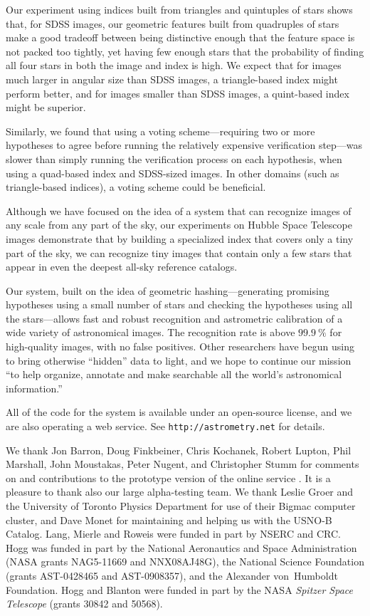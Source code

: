 Our experiment using indices built from triangles and quintuples of
stars shows that, for SDSS images, our geometric features built from
quadruples of stars make a good tradeoff between being distinctive
enough that the feature space is not packed too tightly, yet having
few enough stars that the probability of finding all four stars in
both the image and index is high.  We expect that for images much
larger in angular size than SDSS images, a triangle-based index might
perform better, and for images smaller than SDSS images, a quint-based
index might be superior.


Similarly, we found that using a voting scheme---requiring two or more
hypotheses to agree before running the relatively expensive
verification step---was slower than simply running the verification
process on each hypothesis, when using a quad-based index and
SDSS-sized images.  In other domains (such as triangle-based indices),
a voting scheme could be beneficial.


Although we have focused on the idea of a system that can recognize
images of any scale from any part of the sky, our experiments on
Hubble Space Telescope images demonstrate that by building a
specialized index that covers only a tiny part of the sky, we can
recognize tiny images that contain only a few stars that appear in
even the deepest all-sky reference catalogs.


Our system, built on the idea of geometric hashing---generating
promising hypotheses using a small number of stars and checking the
hypotheses using all the stars---allows fast and robust recognition
and astrometric calibration of a wide variety of astronomical images.
The recognition rate is above $99.9~\percent$ for high-quality images,
with no false positives.  Other researchers have begun using \an to
bring otherwise ``hidden'' data to light, and we hope to continue our
mission ``to help organize, annotate and make searchable all the
world's astronomical information.''


All of the code for the \an system is available under an open-source
license, and we are also operating a web service.  See
\mbox{\texttt{http://astrometry.net}} for details.


\acknowledgments We thank Jon Barron, Doug Finkbeiner, Chris Kochanek,
Robert Lupton, Phil Marshall, John Moustakas, Peter
Nugent, and Christopher Stumm for comments on and contributions to the
prototype version of the online service \an.  It is a pleasure to
thank also our large alpha-testing team.  We thank Leslie Groer and
the University of Toronto Physics Department for use of their Bigmac
computer cluster, and Dave Monet for maintaining and helping us with
the USNO-B Catalog.  Lang, Mierle and Roweis were funded in part by
NSERC and CRC.  Hogg was funded in part by the National Aeronautics
and Space Administration (NASA grants NAG5-11669 and NNX08AJ48G), the
National Science Foundation (grants AST-0428465 and AST-0908357),
and the Alexander
von~Humboldt Foundation.  Hogg and Blanton were funded in part by the NASA
\textit{Spitzer Space Telescope} (grants 30842 and 50568).

